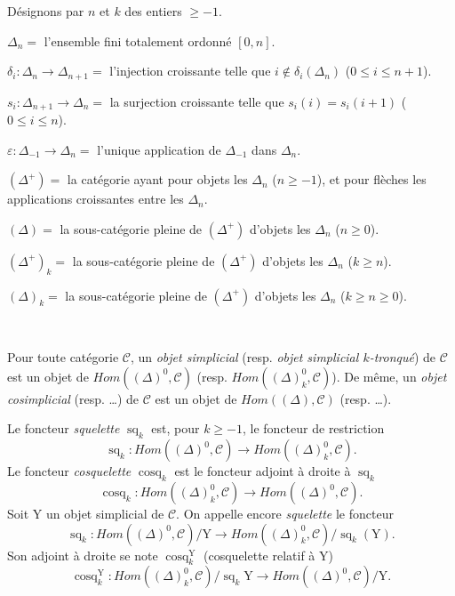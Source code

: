 \documentclass[11pt,leqno]{article}
\newcommand{\Page}[1]{\ifvmode\noindent\else\unskip\ \fi{\footnotesize\textcolor{gray}{[p.\,#1]}}\ \ignorespaces}
\begin{document}
Désignons par \(n\) et \(k\) des entiers \(\geq-1\).

\noindent \(\Delta_n=\) l’ensemble fini totalement ordonné \([0,n]\).\par
\noindent \(\delta_i:\Delta_n\to\Delta_{n+1}=\) l’injection croissante telle que \(i\notin\delta_i(\Delta_n)\) (\(0\leq i\leq n+1\)).\par
\noindent \(s_i:\Delta_{n+1}\to\Delta_n=\) la surjection croissante telle que \(s_i(i)=s_i(i+1)\) (\(0\leq i\leq n\)).\par
\noindent \(\varepsilon:\Delta_{-1}\to\Delta_n=\) l’unique application de \(\Delta_{-1}\) dans \(\Delta_n\).\par
\noindent \((\Delta^+)=\) la catégorie ayant pour objets les \(\Delta_n\) (\(n\geq-1\)), et pour flèches les applications croissantes entre les \(\Delta_n\).\par
\noindent \((\Delta)=\) la sous-catégorie pleine de \((\Delta^+)\) d’objets les \(\Delta_n\) (\(n\geq0\)).\par
\noindent \((\Delta^+)_k=\) la sous-catégorie pleine de \((\Delta^+)\) d’objets les \(\Delta_n\) (\(k\geq n\)).\par
\noindent \((\Delta)_k=\) la sous-catégorie pleine de \((\Delta^+)\) d’objets les \(\Delta_n\) (\(k\geq n\geq0\)).\par

\Page{9}

Pour toute catégorie \(\mathscr{C}\), un \textit{objet simplicial} (resp. \textit{objet simplicial \(k\)-tronqué}) de \(\mathscr{C}\) est un objet de \(\mathit{Hom}((\Delta)^0,\mathscr{C})\) (resp. \(\mathit{Hom}((\Delta)_k^0,\mathscr{C})\)). De même, un \textit{objet cosimplicial} (resp. …) de \(\mathscr{C}\) est un objet de \(\mathit{Hom}((\Delta),\mathscr{C})\) (resp. …).

Le foncteur \textit{squelette} \(\operatorname{sq}_k\) est, pour \(k\geq-1\), le foncteur de restriction
\[
\operatorname{sq}_k:\mathit{Hom}((\Delta)^0,\mathscr{C})
\to\mathit{Hom}((\Delta)_k^0,\mathscr{C}).
\]
Le foncteur \textit{cosquelette} \(\operatorname{cosq}_k\) est le foncteur adjoint à droite à \(\operatorname{sq}_k\)
\[
\operatorname{cosq}_k:\mathit{Hom}((\Delta)_k^0,\mathscr{C})
\to\mathit{Hom}((\Delta)^0,\mathscr{C}).
\]
Soit \(\mathrm{Y}\) un objet simplicial de \(\mathscr{C}\). On appelle encore \textit{squelette} le foncteur
\[
\operatorname{sq}_k:\mathit{Hom}((\Delta)^0,\mathscr{C})/\mathrm{Y}
\to\mathit{Hom}((\Delta)_k^0,\mathscr{C})/\operatorname{sq}_k(\mathrm{Y}).
\]
Son adjoint à droite se note \(\operatorname{cosq}_k^{\mathrm{Y}}\) (cosquelette relatif à \(\mathrm{Y}\))
\[
\operatorname{cosq}_k^{\mathrm{Y}}:
\mathit{Hom}((\Delta)_k^0,\mathscr{C})/\operatorname{sq}_k\mathrm{Y}
\to\mathit{Hom}((\Delta)^0,\mathscr{C})/\mathrm{Y}.
\]
\end{document}
